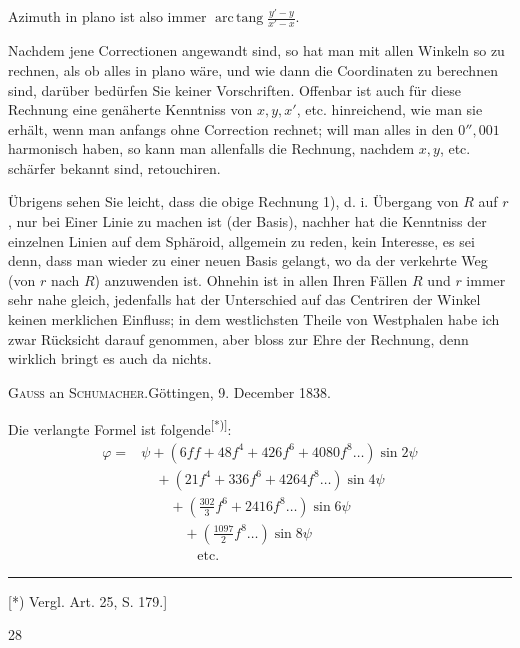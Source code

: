 Azimuth in plano ist also immer \(\operatorname{arc\,tang}\frac{y'-y}{x'-x}\).

Nachdem jene Correctionen angewandt sind, so hat man mit allen Winkeln so zu rechnen, als ob alles in plano wäre, und wie dann die Coordinaten zu berechnen sind, darüber bedürfen Sie keiner Vorschriften. Offenbar ist auch für diese Rechnung eine genäherte Kenntniss von \(x,y,x'\), etc. hinreichend, wie man sie erhält, wenn man anfangs ohne Correction rechnet; will man alles in den \(0''{,}001\) harmonisch haben, so kann man allenfalls die Rechnung, nachdem \(x,y\), etc. schärfer bekannt sind, retouchiren.

Übrigens sehen Sie leicht, dass die obige Rechnung 1), d. i. Übergang von \(R\) auf \(r\), nur bei Einer Linie zu machen ist (der Basis), nachher hat die Kenntniss der einzelnen Linien auf dem Sphäroid, allgemein zu reden, kein Interesse, es sei denn, dass man wieder zu einer neuen Basis gelangt, wo da der verkehrte Weg (von \(r\) nach \(R\)) anzuwenden ist. Ohnehin ist in allen Ihren Fällen \(R\) und \(r\) immer sehr nahe gleich, jedenfalls hat der Unterschied auf das Centriren der Winkel keinen merklichen Einfluss; in dem westlichsten Theile von Westphalen habe ich zwar Rücksicht darauf genommen, aber bloss zur Ehre der Rechnung, denn wirklich bringt es auch da nichts.
\begin{center}\textsc{Gauss} an \textsc{Schumacher}.\quad Göttingen, 9. December 1838.\end{center}
Die verlangte Formel ist folgende\textsuperscript{[*)]}:
\[
\begin{aligned}
\varphi={}&\psi+(6ff+48f^4+426f^6+4080f^8\ldots)\sin2\psi\\
&\quad+(21f^4+336f^6+4264f^8\ldots)\sin4\psi\\
&\qquad+\left(\frac{302}3f^6+2416f^8\ldots\right)\sin6\psi\\
&\qquad\quad+\left(\frac{1097}2f^8\ldots\right)\sin8\psi\\
&\qquad\qquad\text{etc.}
\end{aligned}
\]
\par\noindent\rule{4cm}{.4pt}\par
{\footnotesize\noindent\hspace*{\parindent}[*) Vergl. Art. 25, S. 179.]\par}
\hfill28\hspace*{.12\linewidth}\par

